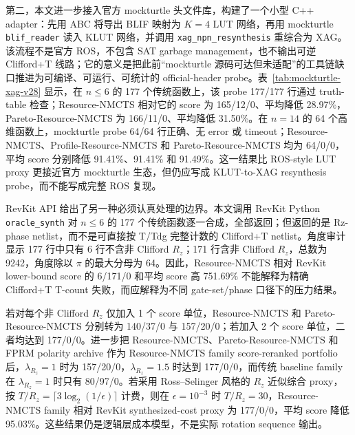 \documentclass[UTF8,fontset=macnew,11pt]{ctexart}
\newcommand{\method}{Resource-NMCTS}
\begin{document}
第二，本文进一步接入官方 mockturtle 头文件库，构建了一个小型 C++ adapter：先用 ABC 将导出 BLIF 映射为 $K=4$ LUT 网络，再用 mockturtle \texttt{blif\_reader} 读入 KLUT 网络，并调用 \texttt{xag\_npn\_resynthesis} 重综合为 XAG。该流程不是官方 ROS，不包含 SAT garbage management，也不输出可逆 Clifford+T 线路；它的意义是把此前“mockturtle 源码可达但未适配”的工具链缺口推进为可编译、可运行、可统计的 official-header probe。表~\ref{tab:mockturtle-xag-v28} 显示，在 $n\leq6$ 的 177 个传统函数上，该 probe 177/177 行通过 truth-table 检查；\method{} 相对它的 score 为 165/12/0、平均降低 28.97\%，Pareto-\method{} 为 166/11/0、平均降低 31.50\%。在 $n=14$ 的 64 个高维函数上，mockturtle probe 64/64 行正确、无 error 或 timeout；\method{}、Profile-\method{} 和 Pareto-\method{} 均为 64/0/0，平均 score 分别降低 91.41\%、91.41\% 和 91.49\%。这一结果比 ROS-style LUT proxy 更接近官方 mockturtle 生态，但仍应写成 KLUT-to-XAG resynthesis probe，而不能写成完整 ROS 复现。

\begin{table}[H]
\centering
\scriptsize
\caption{官方 mockturtle KLUT-to-XAG probe 对比。流程为 ABC $K=4$ BLIF mapping 加 mockturtle \texttt{xag\_npn\_resynthesis}；资源为 XAG AND/XOR/depth 派生的逻辑层 proxy，不是官方 ROS、可逆 garbage management 或硬件 mapping。}
\label{tab:mockturtle-xag-v28}


\vspace{0.8em}

\end{table}

RevKit API 给出了另一种必须认真处理的边界。本文调用 RevKit Python \texttt{oracle\_synth} 对 $n\leq6$ 的 177 个传统函数逐一合成，全部返回；但返回的是 Rz-phase netlist，而不是可直接按 T/Tdg 完整计数的 Clifford+T netlist。角度审计显示 177 行中只有 6 行不含非 Clifford $R_z$；171 行含非 Clifford $R_z$，总数为 9242，角度除以 $\pi$ 的最大分母为 64。因此，\method{} 相对 RevKit lower-bound score 的 6/171/0 和平均 score 高 751.69\% 不能解释为精确 Clifford+T T-count 失败，而应解释为不同 gate-set/phase 口径下的压力结果。

若对每个非 Clifford $R_z$ 仅加入 1 个 score 单位，\method{} 和 Pareto-\method{} 分别转为 140/37/0 与 157/20/0；若加入 2 个 score 单位，二者均达到 177/0/0。进一步把 \method{}、Pareto-\method{} 和 FPRM polarity archive 作为 Resource-NMCTS family score-reranked portfolio 后，$\lambda_{R_z}=1$ 时为 157/20/0，$\lambda_{R_z}=1.5$ 时达到 177/0/0，而传统 baseline family 在 $\lambda_{R_z}=1$ 时只有 80/97/0。若采用 Ross--Selinger 风格的 $R_z$ 近似综合 proxy，按 $T/R_z=\lceil3\log_2(1/\epsilon)\rceil$ 计费，则在 $\epsilon=10^{-3}$ 时 $T/R_z=30$，Resource-NMCTS family 相对 RevKit synthesized-cost proxy 为 177/0/0，平均 score 降低 95.03\%。这些结果仍是逻辑层成本模型，不是实际 rotation sequence 输出。
\end{document}
